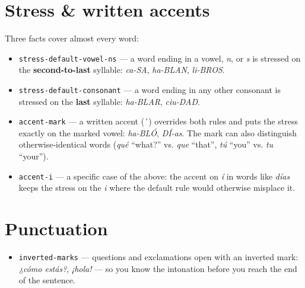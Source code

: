 \section*{Stress \& written accents}

Three facts cover almost every word:

\begin{itemize}
\raggedright
\setlength{\itemsep}{0.35em}
  \item \texttt{stress-default-vowel-ns} — a word ending in a vowel, \emph{n}, or \emph{s} is stressed on the \textbf{second-to-last} syllable: \emph{ca-SA}, \emph{ha-BLAN}, \emph{li-BROS}.
  \item \texttt{stress-default-consonant} — a word ending in any other consonant is stressed on the \textbf{last} syllable: \emph{ha-BLAR}, \emph{ciu-DAD}.
  \item \texttt{accent-mark} — a written accent (´) overrides both rules and puts the stress exactly on the marked vowel: \emph{ha-BLÓ}, \emph{DÍ-as}. The mark can also distinguish otherwise-identical words (\emph{qué} \textquotedblleft{}what?\textquotedblright{} vs. \emph{que} \textquotedblleft{}that\textquotedblright{}, \emph{tú} \textquotedblleft{}you\textquotedblright{} vs. \emph{tu} \textquotedblleft{}your\textquotedblright{}).
  \item \texttt{accent-i} — a specific case of the above: the accent on \emph{í} in words like \emph{días} keeps the stress on the \emph{i} where the default rule would otherwise misplace it.
\end{itemize}

\section*{Punctuation}

\begin{itemize}
\raggedright
\setlength{\itemsep}{0.35em}
  \item \texttt{inverted-marks} — questions and exclamations open with an inverted mark: \emph{¿cómo estás?}, \emph{¡hola!} — so you know the intonation before you reach the end of the sentence.
\end{itemize}
